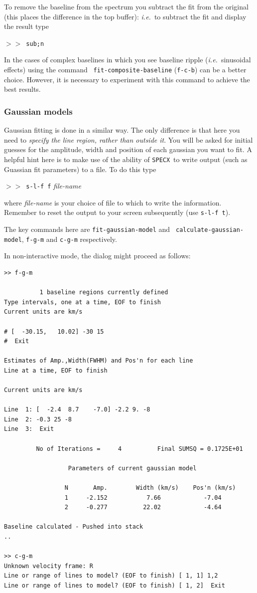 \documentclass[11pt,twoside]{article}
\newcommand{\ie}{{\it i.e.}}
\newcommand{\SPECX}{{\tt SPECX}}
\newcommand{\SP}{{$>\!>$}}
\begin{document}
To remove the baseline from the spectrum you subtract the fit from the
original (this places the difference in the top buffer): \ie\ to
subtract the fit and display the result type

\SP\ \verb|sub;n|

In the cases of complex baselines in which you see baseline ripple
(\ie\ sinusoidal effects) using the command {\tt
fit-composite-baseline} ({\tt{f-c-b}}) can be a better choice. However,
it is necessary to experiment with this command to achieve the best
results.

\subsubsection{Gaussian models}
Gaussian fitting is done in a similar way.  The only difference is
that here you need to {\it specify the line region, rather than outside
it}. You will be asked for initial guesses for the amplitude, width and
position of each gaussian you want to fit. A helpful hint here is to
make use of the ability of \SPECX\ to write output (such as Guassian
fit parameters) to a file. To do this type

\SP\ \verb|s-l-f f| {\it file-name}

where {\it file-name} is your choice of file to which to write the
information.  Remember to reset the output to your screen subsequently
(use {\tt s-l-f t}).

The key commands here are {\tt fit-gaussian-model} and {\tt
calculate-gaussian-model}, {\tt f-g-m} and {\tt c-g-m} respectively.

In non-interactive mode, the dialog might proceed as follows:
\begin{verbatim}
>> f-g-m

          1 baseline regions currently defined
Type intervals, one at a time, EOF to finish
Current units are km/s

# [  -30.15,   10.02] -30 15
#  Exit

Estimates of Amp.,Width(FWHM) and Pos'n for each line
Line at a time, EOF to finish

Current units are km/s

Line  1: [  -2.4  8.7    -7.0] -2.2 9. -8
Line  2: -0.3 25 -8
Line  3:  Exit

         No of Iterations =     4          Final SUMSQ = 0.1725E+01

                  Parameters of current gaussian model

                 N       Amp.        Width (km/s)    Pos'n (km/s)
                 1     -2.152           7.66            -7.04
                 2     -0.277          22.02            -4.64

Baseline calculated - Pushed into stack
..

>> c-g-m
Unknown velocity frame: R
Line or range of lines to model? (EOF to finish) [ 1, 1] 1,2
Line or range of lines to model? (EOF to finish) [ 1, 2]  Exit
\end{verbatim}
\end{document}
